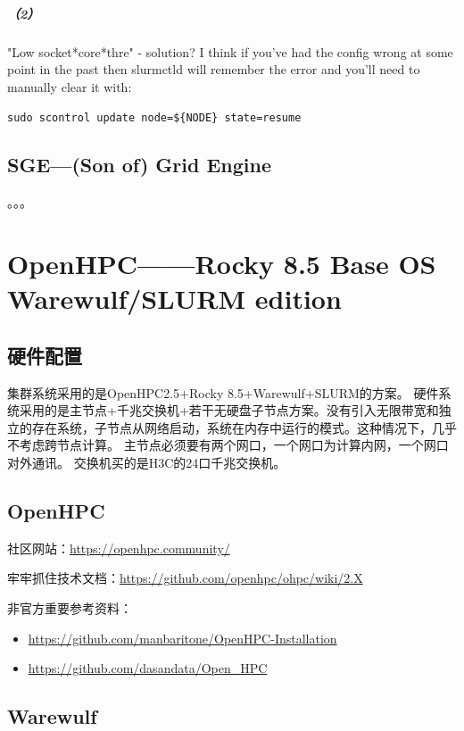 {\paragraph{（2）}
"Low socket*core*thre" - solution?
I think if you've had the config wrong at some point in the past then slurmctld 
will remember the error and you'll need to manually clear it with:

\verb|sudo scontrol update node=${NODE} state=resume|



\section{SGE—(Son of) Grid Engine}
。。。












\chapter[OpenHPC]{OpenHPC——Rocky 8.5 Base OS Warewulf/SLURM edition}
\section{硬件配置}
集群系统采用的是OpenHPC2.5+Rocky 8.5+Warewulf+SLURM的方案。
硬件系统采用的是主节点+千兆交换机+若干无硬盘子节点方案。没有引入无限带宽和独立的存在系统，子节点从网络启动，系统在内存中运行的模式。这种情况下，几乎不考虑跨节点计算。
主节点必须要有两个网口，一个网口为计算内网，一个网口对外通讯。
交换机买的是H3C的24口千兆交换机。


\section{OpenHPC}
社区网站：\url{https://openhpc.community/}

牢牢抓住技术文档：\url{https://github.com/openhpc/ohpc/wiki/2.X}

非官方重要参考资料：
\begin{itemize}
\item \url{https://github.com/manbaritone/OpenHPC-Installation}

\item \url{https://github.com/dasandata/Open_HPC}
\end{itemize}



\section{Warewulf}



}
